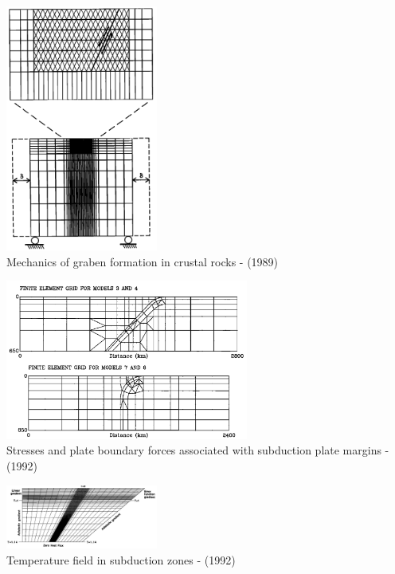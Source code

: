 \begin{center}
\begin{minipage}{0.35\textwidth}
\centering
\includegraphics[width=5cm]{images/history/mewi89}\\
{\captionfont Mechanics of graben formation in crustal rocks - \textcite{mewi89} (1989)}
\end{minipage}\hfill
\begin{minipage}{0.55\textwidth}
\centering
\includegraphics[width=8cm]{images/history/whbw92}\\
{\captionfont Stresses and plate boundary forces associated with subduction plate margins
- \cite{whbw92} (1992)}
\end{minipage}
\end{center}


\begin{center}
\includegraphics[width=5cm]{images/history/dast92}\\
{\captionfont Temperature field in subduction zones - \textcite{dast92} (1992)}
\end{center}


